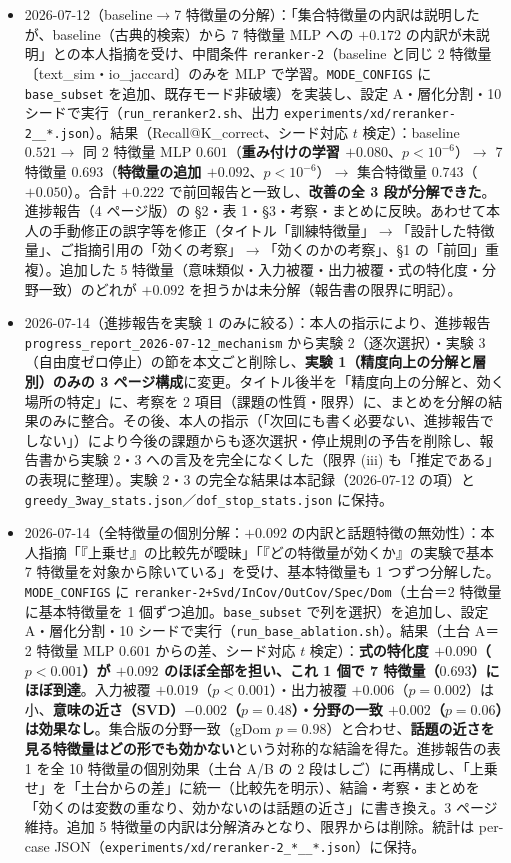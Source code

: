 \documentclass[11pt,a4paper]{jsarticle}
\begin{document}
\begin{itemize}[nosep]
  \item 2026-07-12（baseline$\to$7 特徴量の分解）：「集合特徴量の内訳は説明したが、baseline（古典的検索）から 7 特徴量 MLP への $+0.172$ の内訳が未説明」との本人指摘を受け、中間条件 \texttt{reranker-2}（baseline と同じ 2 特徴量〔text\_sim・io\_jaccard〕のみを MLP で学習。\texttt{MODE\_CONFIGS} に \texttt{base\_subset} を追加、既存モード非破壊）を実装し、設定 A・層化分割・10 シードで実行（\texttt{run\_reranker2.sh}、出力 \texttt{experiments/xd/reranker-2\_\_*.json}）。結果（Recall@K\_correct、シード対応 $t$ 検定）：baseline $0.521 \to$ 同 2 特徴量 MLP $0.601$（\textbf{重み付けの学習 $+0.080$}、$p<10^{-6}$）$\to$ 7 特徴量 $0.693$（\textbf{特徴量の追加 $+0.092$}、$p<10^{-6}$）$\to$ 集合特徴量 $0.743$（$+0.050$）。合計 $+0.222$ で前回報告と一致し、\textbf{改善の全 3 段が分解できた}。進捗報告（4 ページ版）の \S2・表 1・\S3・考察・まとめに反映。あわせて本人の手動修正の誤字等を修正（タイトル「訓練特徴量」$\to$「設計した特徴量」、ご指摘引用の「効くの考察」$\to$「効くのかの考察」、\S1 の「前回」重複）。追加した 5 特徴量（意味類似・入力被覆・出力被覆・式の特化度・分野一致）のどれが $+0.092$ を担うかは未分解（報告書の限界に明記）。
  \item 2026-07-14（進捗報告を実験 1 のみに絞る）：本人の指示により、進捗報告 \texttt{progress\_report\_2026-07-12\_mechanism} から実験 2（逐次選択）・実験 3（自由度ゼロ停止）の節を本文ごと削除し、\textbf{実験 1（精度向上の分解と層別）のみの 3 ページ構成}に変更。タイトル後半を「精度向上の分解と、効く場所の特定」に、考察を 2 項目（課題の性質・限界）に、まとめを分解の結果のみに整合。その後、本人の指示（「次回にも書く必要ない、進捗報告でしない」）により今後の課題からも逐次選択・停止規則の予告を削除し、報告書から実験 2・3 への言及を完全になくした（限界 (iii) も「推定である」の表現に整理）。実験 2・3 の完全な結果は本記録（2026-07-12 の項）と \texttt{greedy\_3way\_stats.json}／\texttt{dof\_stop\_stats.json} に保持。
  \item 2026-07-14（全特徴量の個別分解：$+0.092$ の内訳と話題特徴の無効性）：本人指摘「『上乗せ』の比較先が曖昧」「『どの特徴量が効くか』の実験で基本 7 特徴量を対象から除いている」を受け、基本特徴量も 1 つずつ分解した。\texttt{MODE\_CONFIGS} に \texttt{reranker-2+Svd/InCov/OutCov/Spec/Dom}（土台＝2 特徴量に基本特徴量を 1 個ずつ追加。\texttt{base\_subset} で列を選択）を追加し、設定 A・層化分割・10 シードで実行（\texttt{run\_base\_ablation.sh}）。結果（土台 A＝2 特徴量 MLP $0.601$ からの差、シード対応 $t$ 検定）：\textbf{式の特化度 $+0.090$（$p<0.001$）が $+0.092$ のほぼ全部を担い、これ 1 個で 7 特徴量（$0.693$）にほぼ到達}。入力被覆 $+0.019$（$p<0.001$）・出力被覆 $+0.006$（$p=0.002$）は小、\textbf{意味の近さ（SVD）$-0.002$（$p=0.48$）・分野の一致 $+0.002$（$p=0.06$）は効果なし}。集合版の分野一致（gDom $p=0.98$）と合わせ、\textbf{話題の近さを見る特徴量はどの形でも効かない}という対称的な結論を得た。進捗報告の表 1 を全 10 特徴量の個別効果（土台 A/B の 2 段はしご）に再構成し、「上乗せ」を「土台からの差」に統一（比較先を明示）、結論・考察・まとめを「効くのは変数の重なり、効かないのは話題の近さ」に書き換え。3 ページ維持。追加 5 特徴量の内訳は分解済みとなり、限界からは削除。統計は per-case JSON（\texttt{experiments/xd/reranker-2\_*\_\_*.json}）に保持。

\end{itemize}
\end{document}
